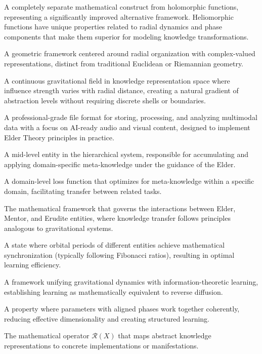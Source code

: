 \begin{description}[leftmargin=2cm, style=nextline]
    \item[Heliomorphic Function] A completely separate mathematical construct from holomorphic functions, representing a significantly improved alternative framework. Heliomorphic functions have unique properties related to radial dynamics and phase components that make them superior for modeling knowledge transformations.
    
    \item[Heliomorphic Geometry] A geometric framework centered around radial organization with complex-valued representations, distinct from traditional Euclidean or Riemannian geometry.
    
    \item[Gravitational Influence Field] A continuous gravitational field in knowledge representation space where influence strength varies with radial distance, creating a natural gradient of abstraction levels without requiring discrete shells or boundaries.
    
    \item[MAGE File] A professional-grade file format for storing, processing, and analyzing multimodal data with a focus on AI-ready audio and visual content, designed to implement Elder Theory principles in practice.
    
    \item[Mentor] A mid-level entity in the hierarchical system, responsible for accumulating and applying domain-specific meta-knowledge under the guidance of the Elder.
    
    \item[Mentor Loss] A domain-level loss function that optimizes for meta-knowledge within a specific domain, facilitating transfer between related tasks.
    
    \item[Orbital Mechanics] The mathematical framework that governs the interactions between Elder, Mentor, and Erudite entities, where knowledge transfer follows principles analogous to gravitational systems.
    
    \item[Orbital Resonance] A state where orbital periods of different entities achieve mathematical synchronization (typically following Fibonacci ratios), resulting in optimal learning efficiency.
    
    \item[Orbital Thermodynamics] A framework unifying gravitational dynamics with information-theoretic learning, establishing learning as mathematically equivalent to reverse diffusion.
    
    \item[Phase Coherence] A property where parameters with aligned phases work together coherently, reducing effective dimensionality and creating structured learning.
    
    \item[Realization] The mathematical operator $\mathcal{R}(X)$ that maps abstract knowledge representations to concrete implementations or manifestations.
\end{description}